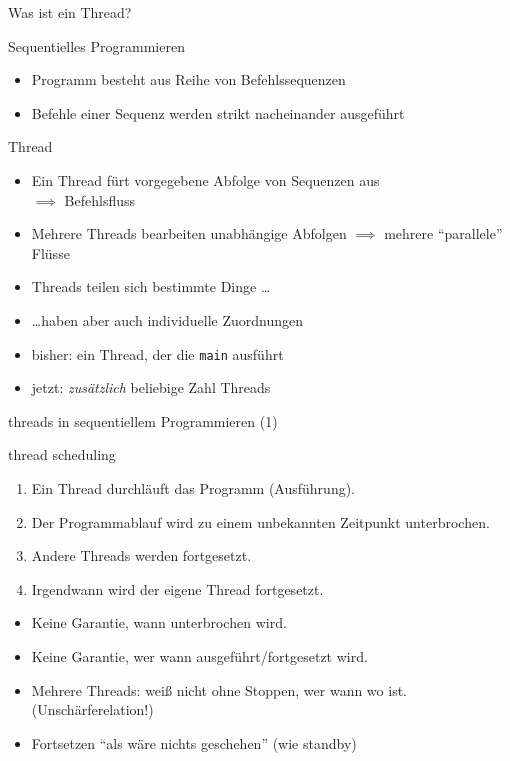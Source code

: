 \begin{frame}{Was ist ein Thread?}
	\begin{block}{Sequentielles Programmieren}
		\begin{itemize}
			\item Programm besteht aus Reihe von Befehlssequenzen
			\item Befehle einer Sequenz werden strikt nacheinander ausgeführt
		\end{itemize}
	\end{block}
	
	\pause
	
	\begin{block}{Thread}
		\begin{itemize}
			\item Ein Thread fürt vorgegebene Abfolge von Sequenzen aus	\\
				$\implies$ Befehlsfluss
			\item Mehrere Threads bearbeiten unabhängige Abfolgen
				$\implies$ mehrere \enquote{parallele} Flüsse
			\item Threads teilen sich bestimmte Dinge \dots
			\item \dots haben aber auch individuelle Zuordnungen
			\item bisher: ein Thread, der die \texttt{main} ausführt
			\item jetzt: \emph{zusätzlich} beliebige Zahl Threads
		\end{itemize}
	\end{block}
\end{frame}

\begin{frame}{threads in sequentiellem Programmieren (1)}
	\begin{block}{thread scheduling}
		\begin{enumerate}
			\item Ein Thread durchläuft das Programm (Ausführung).
			\item Der Programmablauf wird zu einem unbekannten Zeitpunkt unterbrochen.
			\item Andere Threads werden fortgesetzt.
			\item Irgendwann wird der eigene Thread fortgesetzt.
		\end{enumerate}
		
		\pause
		
		\begin{itemize}
			\item Keine Garantie, wann unterbrochen wird.
			\item Keine Garantie, wer wann ausgeführt/fortgesetzt wird.
			\item Mehrere Threads: weiß nicht ohne Stoppen, wer wann wo ist. (Unschärferelation!)
			\item Fortsetzen \enquote{als wäre nichts geschehen} (wie standby)
		\end{itemize}
	\end{block}
\end{frame}

